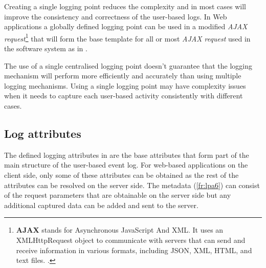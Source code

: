 Creating a single logging point reduces the complexity and in most cases will improve the consistency and correctness of the user-based logs. In Web applications a globally defined logging point can be used in a modified \textit{AJAX request}\footnote{\textbf{AJAX} stands for Asynchronous JavaScript And XML. It uses an XMLHttpRequest object to communicate with servers that can send and receive information in various formats, including JSON, XML, HTML, and text files. \cite{Mozilla2022a}.} that will form the base template for all or most \textit{AJAX request} used in the software system as in .\par The use of a single centralised logging point doesn't guarantee that the logging mechanism will perform more efficiently and accurately than using multiple logging mechanisms. Using a single logging point may have complexity issues when it needs to capture each user-based activity consistently with different cases.

\subsection{Log attributes}\label{sec:ch2_logAttributes}
The defined logging attributes in  are the base attributes that form part of the main structure of the user-based event log. For web-based applications on the
client side, only some of these attributes can be obtained as the rest of the attributes can be resolved on the server side. The metadata (\ref{fr:lpa6}) can consist of the request parameters that are
obtainable on the server side but any additional captured data can be added and sent to the server.

